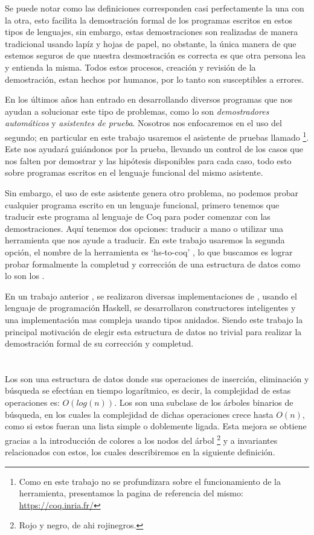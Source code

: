 Se puede notar como las definiciones corresponden casi perfectamente la una con la otra,
esto facilita la demostraci\'on formal de los programas escritos en estos tipos de lenguajes, sin
embargo, estas demostraciones son realizadas de manera tradicional usando lap\'iz y hojas de papel,
no obstante, la \'unica manera de que estemos seguros de que nuestra desmostraci\'on es correcta es
que otra persona lea y entienda la misma. Todos estos procesos, creaci\'on y revisi\'on de la
demostraci\'on, estan hechos por humanos, por lo tanto son susceptibles a errores.

En los últimos años han entrado en desarrollando diversos programas que nos ayudan a solucionar
este tipo de problemas, como lo son \textit{demostradores autom\'aticos} y \textit{asistentes de
prueba}. Nosotros nos enfocaremos en el uso del segundo; en particular en este trabajo usaremos el
asistente de pruebas llamado {\coq}\footnote{Como en este trabajo no se profundizara sobre el funcionamiento de la herramienta, presentamos la pagina de referencia del mismo: \url{https://coq.inria.fr/}}. Este nos ayudar\'a gui\'andonos por la prueba, llevando un
control de los casos que nos falten por demostrar y las hip\'otesis disponibles para cada caso,
todo esto sobre programas escritos en el lenguaje funcional del mismo asistente.

Sin embargo, el uso de este asistente genera otro problema, no podemos probar cualquier programa
escrito en un lenguaje funcional, primero tenemos que traducir este programa al lenguaje de Coq
para poder comenzar con las demostraciones. Aquí tenemos dos opciones: traducir a mano o utilizar
una herramienta que nos ayude a traducir. En este trabajo usaremos la segunda opci\'on, el nombre
de la herramienta es `hs-to-coq' \cite{thrc}, lo que buscamos es lograr probar formalmente la
completud y correcci\'on de una estructura de datos como lo son los {\arns}.

En un trabajo anterior \cite{tesisG}, se realizaron diversas implementaciones de {\arns}, usando el
lenguaje de programaci\'on Haskell, se desarrollaron constructores inteligentes y una
implementaci\'on mas compleja usando tipos anidados. Siendo este trabajo la principal motivaci\'on
de elegir esta estructura de datos no trivial para realizar la demostraci\'on formal de su
corrección y completud.

\section{\Arns}
Los {\arns} son una estructura de datos donde sus operaciones de inserci\'on, eliminaci\'on y
búsqueda se efectúan en tiempo logarítmico, es decir, la complejidad de estas operaciones es:
$O(log(n))$. Los {\arns} son una subclase de los \'arboles binarios de búsqueda, en los cuales la
complejidad de dichas operaciones crece hasta $O(n)$, como si estos fueran una lista simple o
doblemente ligada. Esta mejora se obtiene gracias a la introducción de colores a los nodos del
\'arbol \footnote{Rojo y negro, de ahi rojinegros.} y a invariantes relacionados con estos, los
cuales describiremos en la siguiente definici\'on.

